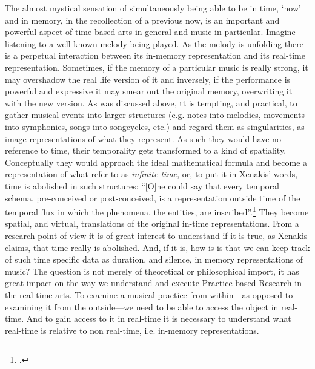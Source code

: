 The almost mystical sensation of simultaneously being able to be in time, `now' and in memory, in the recollection of a previous now, is an important and powerful aspect of time-based arts in general and music in particular. Imagine listening to a well known melody being played. As the melody is unfolding there is a perpetual interaction between its in-memory representation and its real-time representation. Sometimes, if the memory of a particular music is really strong, it may overshadow the real life version of it and inversely, if the performance is powerful and expressive it may smear out the original memory, overwriting it with the new version. As was discussed above, tt is tempting, and practical, to gather musical events into larger structures (e.g. notes into melodies, movements into symphonies, songs into songcycles, etc.) and regard them as singularities, as image representations of what they represent. As such they would have no reference to time, their temporality gets transformed to a kind of spatiality. Conceptually they would approach the ideal mathematical formula and become a representation of what  \citeauthor{roads} refer to as \emph{infinite time}, or, to put it in Xenakis' words, time is abolished in such structures: ``[O]ne could say that every temporal schema, pre-conceived or post-conceived, is a representation outside time of the temporal flux in which the phenomena, the entities, are  inscribed''.\footcite[264]{xenakis71} They become spatial, and virtual, translations of the original in-time representations. From a research point of view it is of great interest to understand if it is true, as Xenakis claims, that time really is abolished. And, if it is, how is is that we can keep track of such time specific data as duration, and silence, in memory representations of music? The question is not merely of theoretical or philosophical import, it has great impact on the way we understand and execute Practice based Research in the real-time arts. To examine a musical practice from within---as opposed to examining it from the outside---we need to be able to access the object in real-time. And to gain access to it in real-time it is necessary to understand what real-time is relative to non real-time, i.e. in-memory representations.

